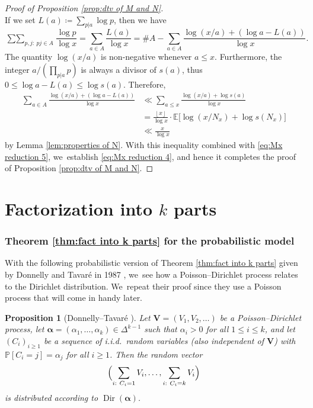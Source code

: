 \documentclass[10pt]{amsart}
\newcommand{\bV}{{\boldsymbol V}}
\newcommand{\PP}{\mathbb{P}}
\newcommand{\EE}{\mathbb{E}}
\newcommand{\boldalpha}{\boldsymbol{\alpha}}
\newcommand{\floor}[1]{\left\lfloor #1 \right\rfloor}
\newcommand{\simplex}{\Delta^{k-1}}
\newcommand{\bg}{\big}
\DeclareMathOperator{\Dir}{Dir}
\theoremstyle{plain}
\newtheorem{prop}[cor]{Proposition}
\theoremstyle{definition}
\begin{document}
\begin{proof}[Proof of Proposition \ref{prop:dtv of M and N}]
\begin{equation}
\end{equation}
If we set $L(a)\coloneqq \sum_{p|a}\log p$, then we have
\begin{equation}
\label{eq:Mx reduction 5}
\mathop{\sum\sum}_{p,j:\ pj \in A} \frac{\log p}{\log x} = \sum_{a\in A}\frac{L(a)}{\log x} = \# A
- \sum_{a\in A} \frac{\log(x/a) + (\log a - L(a))}{\log x}.
\end{equation}
The quantity $\log(x/a)$ is non-negative whenever $a \le x$. Furthermore, the integer $a/(\prod_{p|a} p)$ is always a divisor of $s(a)$, thus $0 \le \log a - L(a) \le \log s(a)$. Therefore,
\begin{align*}
\sum_{a\in A} \frac{\log(x/a) + (\log a - L(a))}{\log x} &\ll \sum_{a\le x} \frac{\log(x/a) + \log s(a)}{\log x} \\
&= \frac{\floor x}{\log x} \cdot \EE\bg[\log(x/N_x) + \log s(N_x)\bg] \\
&\ll \frac{x}{\log x}
\end{align*}
by Lemma \ref{lem:properties of N}. With this inequality combined with \eqref{eq:Mx reduction 5}, we~establish \eqref{eq:Mx reduction 4}, and hence it completes the proof of Proposition \ref{prop:dtv of M and N}.
\end{proof}

\part{Factorization into \texorpdfstring{$k$}{k} parts}\label{part:DDT}

\section{Theorem \ref{thm:fact into k parts} for the probabilistic model}\label{sec:Donnelly-Tavare}

With the following probabilistic version of Theorem \ref{thm:fact into k parts} given by Donnelly and Tavaré in 1987 \cite[\S 3]{DonnellyTavare87}, we~see how a Poisson--Dirichlet process relates to the Dirichlet distribution. We~repeat their proof since they use a Poisson process that will come in handy later.

\begin{prop}[Donnelly--Tavaré \cite{DonnellyTavare87}]
\label{prop:probabilistic dirichlet law}
Let $\bV = (V_1, V_2, \ldots)$ be a Poisson--Dirichlet process, let $\boldalpha = (\alpha_1, \ldots, \alpha_k) \in \simplex$ such that $\alpha_i > 0$ for all $1 \le i \le k$, and let $(C_i)_{i \ge 1}$ be a sequence of i.i.d.~random variables (also independent of $\bV$) with $\PP[C_i = j] = \alpha_j$ for all $i \ge 1$. Then the random vector
\[
\Bigl(\sum_{i:\ C_i = 1} V_i, \ldots, \sum_{i:\ C_i = k} V_i\Bigr)
\]
is distributed according to $\Dir(\boldalpha)$.
\end{prop}
\end{document}
